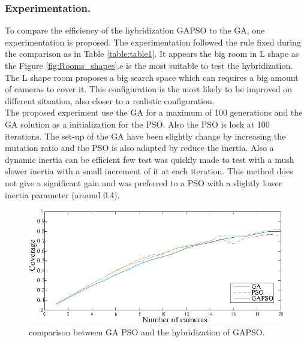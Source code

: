 \subsubsection{Experimentation.}
To compare the efficiency of the hybridization GAPSO to the GA, one experimentation is proposed.
The experimentation followed the rule fixed during the comparison as in Table \ref{table:table1}. %
It appears the big room in L shape as the Figure \ref{fig:Rooms_shapes}.e is the most suitable to test the hybridization.  %
The L shape room proposes a big search space which can requires a big amount of cameras to cover it. This configuration is the most likely to be improved on different situation, also closer to a realistic configuration.\\
The proposed experiment use the GA for a maximum of 100 generations and the GA solution as a initialization for the PSO. Also the PSO is lock at 100 iterations. %
The set-up of the GA have been slightly change by increasing the mutation ratio and the PSO is also adapted by reduce the inertia. Also a dynamic inertia can be efficient few test was quickly made to test with a mush slower inertia with a small increment  of it at each iteration. This method does not give a significant gain and was preferred to a PSO with a slightly lower inertia parameter (around 0.4).
\begin{figure}[t]
  \includegraphics[width=\linewidth]{img/GAPSO_GA_PSO3.eps}
  \caption{comparison between GA PSO and the hybridization of GAPSO.
}\label{fig:GAPSO}
  \endminipage\hfill
\end{figure}

